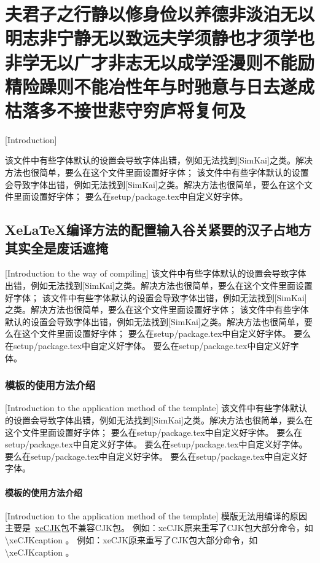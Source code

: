 
\chapter{夫君子之行静以修身俭以养德非淡泊无以明志非宁静无以致远夫学须静也才须学也非学无以广才非志无以成学淫漫则不能励精险躁则不能冶性年与时驰意与日去遂成枯落多不接世悲守穷庐将复何及}[Introduction]

该文件中有些字体默认的设置会导致字体出错，例如无法找到[SimKai]之类。解决方法也很简单，要么在这个文件里面设置好字体；
该文件中有些字体默认的设置会导致字体出错，例如无法找到[SimKai]之类。解决方法也很简单，要么在这个文件里面设置好字体；
要么在setup/package.tex中自定义好字体。
\section{XeLaTeX编译方法的配置输入谷关紧要的汉子占地方其实全是废话遮掩}[Introduction to the \XeLaTeX way of compiling]
该文件中有些字体默认的设置会导致字体出错，例如无法找到[SimKai]之类。解决方法也很简单，要么在这个文件里面设置好字体；
该文件中有些字体默认的设置会导致字体出错，例如无法找到[SimKai]之类。解决方法也很简单，要么在这个文件里面设置好字体；
该文件中有些字体默认的设置会导致字体出错，例如无法找到[SimKai]之类。解决方法也很简单，要么在这个文件里面设置好字体；
要么在setup/package.tex中自定义好字体。
要么在setup/package.tex中自定义好字体。
要么在setup/package.tex中自定义好字体。
\subsection{模板的使用方法介绍}[Introduction to the application method of the template]
该文件中有些字体默认的设置会导致字体出错，例如无法找到[SimKai]之类。解决方法也很简单，要么在这个文件里面设置好字体；
要么在setup/package.tex中自定义好字体。
要么在setup/package.tex中自定义好字体。
要么在setup/package.\cite{kanamori1998shaking}tex中自定义好字体。
要么在setup/package.tex中自定义好字体。
要么在setup/package.tex中自定义好字体。
\subsubsection{模板的使用方法介绍}[Introduction to the application method of the template]
模版无法用\XeLaTeX 编译的原因主要是~\href{http://bay.uchicago.edu/tex-archive/macros/xetex/latex/xecjk/xeCJK.pdf}{xeCJK}包不兼容CJK包。
例如：xeCJK原来重写了CJK包大部分命令，如\textbackslash xeCJKcaption 。
例如：xeCJK原来重写了CJK包大部分命令，如\textbackslash xeCJKcaption 。
